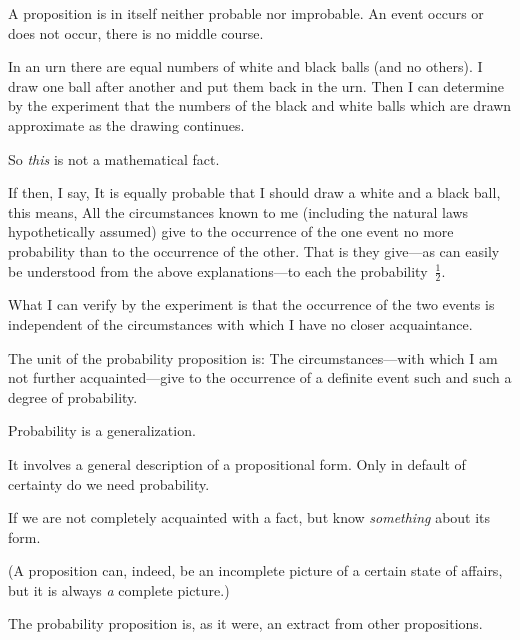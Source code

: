 {A proposition is in itself neither probable nor
improbable. An event occurs or does not occur,
there is no middle course.}


{In an urn there are equal numbers of white
and black balls (and no others). I draw one
ball after another and put them back in the
urn. Then I can determine by the experiment
that the numbers of the black and white balls
which are drawn approximate as the drawing
continues.

So \emph{this} is not a mathematical fact.

If then, I say, It is equally probable that
I should draw a white and a black ball, this
means, All the circumstances known to me (including
the natural laws hypothetically assumed)
give to the occurrence of the one event no more
probability than to the occurrence of the other.
That is they give---as can easily be understood
from the above explanations---to each the
probability~$\frac{1}{2}$.

What I can verify by the experiment is that
the occurrence of the two events is independent
of the circumstances with which I have no closer
acquaintance.}


{The unit of the probability proposition is: The
circumstances---with which I am not further acquainted---give
to the occurrence of a definite event
such and such a degree of probability.}


{Probability is a generalization.

It involves a general description of a propositional
form. Only in default of certainty do we
need probability.

If we are not completely acquainted with a fact,
but know \emph{something} about its form.

(A proposition can, indeed, be an incomplete
picture of a certain state of affairs, but it is always
\emph{a} complete picture.)

The probability proposition is, as it were, an
extract from other propositions.}
